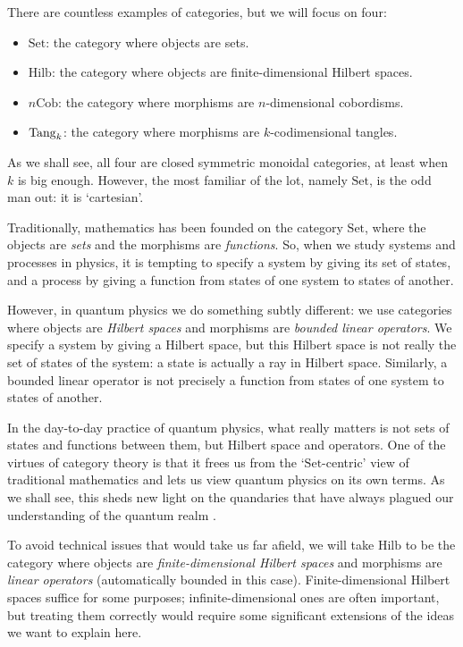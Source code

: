\documentclass[12pt]{article}
\newcommand{\Cob}{\mathrm{Cob}}
\newcommand{\Hilb}{\mathrm{Hilb}}
\newcommand{\Set}{\mathrm{Set}}
\newcommand{\Tang}{{\rm Tang}}
\begin{document}
There are countless examples of categories, but we will focus on 
four:
\begin{itemize}
\item $\Set$: the category where objects are sets.
\item $\Hilb$: the category where objects are finite-dimensional 
      Hilbert spaces.
\item $n\Cob$: the category where morphisms are $n$-dimensional 
      cobordisms.
\item $\Tang_k$: the category where morphisms are $k$-codimensional
      tangles.
\end{itemize}
As we shall see, all four are closed symmetric monoidal categories,
at least when $k$ is big enough.  However, the most familiar of the 
lot, namely $\Set$, is the odd man out: it is `cartesian'.

Traditionally, mathematics has been founded on the category $\Set$,
where the objects are {\em sets} and the morphisms are {\em
functions}.  So, when we study systems and processes in physics, it is
tempting to specify a system by giving its set of states, and a
process by giving a function from states of one system to states of
another.

However, in quantum physics we do something subtly different:
we use categories where objects are {\em Hilbert spaces} 
and morphisms are {\em bounded linear operators}.  We specify a
system by giving a Hilbert space, but this Hilbert space is 
not really the set of states of the system: a state is actually
a ray in Hilbert space.  Similarly, a bounded linear operator is
not precisely a function from states of one system to states of
another.  

In the day-to-day practice of quantum physics, what really matters is
not sets of states and functions between them, but Hilbert space and
operators.  One of the virtues of category theory is that it frees us
from the `$\Set$-centric' view of traditional mathematics and lets us
view quantum physics on its own terms.  As we shall see, this sheds
new light on the quandaries that have always plagued our understanding
of the quantum realm \cite{B4}.

To avoid technical issues that would take us far afield, we will
take $\Hilb$ to be the category where objects are {\em finite-dimensional
Hilbert spaces} and morphisms are {\em linear operators}
(automatically bounded in this case).  Finite-dimensional
Hilbert spaces suffice for some purposes; infinite-dimensional ones
are often important, but treating them correctly would 
require some significant extensions of the ideas we want to explain here.
\end{document}
